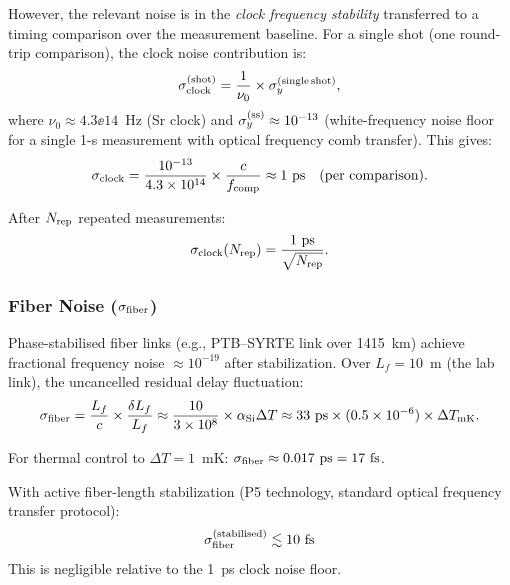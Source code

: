 However, the relevant noise is in the \emph{clock frequency stability}
transferred to a timing comparison over the measurement baseline. For a
single shot (one round-trip comparison), the clock noise contribution is:
\begin{equation}
\sigma_{\rm clock}^{(\rm shot)} = \frac{1}{\nu_0}
\times \sigma_y^{(\rm single\,shot)},
\label{eq:clock_shot}
\end{equation}
where $\nu_0 \approx 4.3\ee{14}$~Hz (Sr clock) and $\sigma_y^{(\rm ss)}
\approx 10^{-13}$ (white-frequency noise floor for a single 1-s measurement
with optical frequency comb transfer). This gives:
\begin{equation}
\sigma_{\rm clock} = \frac{10^{-13}}{4.3\times 10^{14}} \times \frac{c}{f_{\rm comp}}
\approx 1~\text{ps} \quad (\text{per comparison}).
\label{eq:clock_noise_1ps}
\end{equation}

After $N_{\rm rep}$ repeated measurements:
\begin{equation}
\sigma_{\rm clock}(N_{\rm rep}) = \frac{1~\text{ps}}{\sqrt{N_{\rm rep}}}.
\label{eq:clock_noise_averaged}
\end{equation}

\subsubsection{Fiber Noise ($\sigma_{\rm fiber}$)}

Phase-stabilised fiber links (e.g., PTB--SYRTE link over 1415~km) achieve
fractional frequency noise $\approx 10^{-19}$ after stabilization. Over
$L_f = 10$~m (the lab link), the uncancelled residual delay fluctuation:
\begin{equation}
\sigma_{\rm fiber} = \frac{L_f}{c} \times \frac{\delta L_f}{L_f}
\approx \frac{10}{3\times 10^{8}} \times \alpha_{\rm Si} \Delta T
\approx 33~\text{ps} \times (0.5\times 10^{-6}) \times \Delta T_{\rm mK}.
\label{eq:fiber_noise}
\end{equation}

For thermal control to $\Delta T = 1$~mK:
$\sigma_{\rm fiber} \approx 0.017~\text{ps} = 17~\text{fs}$.

With active fiber-length stabilization (P5 technology, standard optical
frequency transfer protocol):
\begin{equation}
\sigma_{\rm fiber}^{(\rm stabilised)} \lesssim 10~\text{fs}
\label{eq:fiber_stabilised}
\end{equation}
This is negligible relative to the 1~ps clock noise floor.

